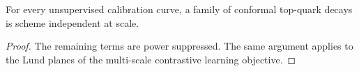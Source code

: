 \begin{corollary}[Finiteness]\label{thm:4}
For every unsupervised calibration curve, a family of conformal
top-quark decays is scheme independent at scale.
\end{corollary}

\begin{proof}
The remaining terms are power suppressed. The same argument applies to
the Lund planes of the multi-scale contrastive learning objective.
\end{proof}

